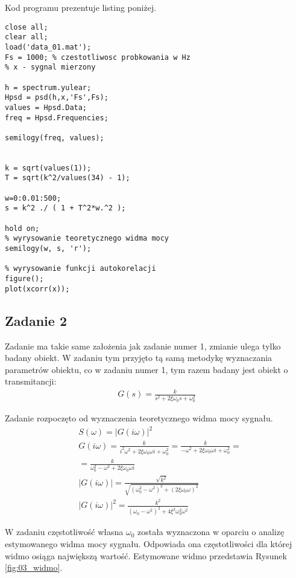 \documentclass[a4paper,15pt]{article}
\begin{document}
Kod programu prezentuje listing poniżej.
\begin{lstlisting}[caption=Zadanie 1, captionpos=b,label=lis1, firstnumber=1,frame=single]
close all;
clear all;
load('data_01.mat');
Fs = 1000; % czestotliwosc probkowania w Hz
% x - sygnal mierzony

h = spectrum.yulear;
Hpsd = psd(h,x,'Fs',Fs);
values = Hpsd.Data;
freq = Hpsd.Frequencies;

semilogy(freq, values);


k = sqrt(values(1));
T = sqrt(k^2/values(34) - 1);

w=0:0.01:500;
s = k^2 ./ ( 1 + T^2*w.^2 );

hold on;
% wyrysowanie teoretycznego widma mocy
semilogy(w, s, 'r');

% wyrysowanie funkcji autokorelacji
figure();
plot(xcorr(x));

\end{lstlisting}


\newpage
\subsection{Zadanie 2 }
Zadanie ma takie same założenia jak zadanie numer 1, zmianie ulega tylko badany obiekt. W zadaniu tym przyjęto tą samą metodykę wyznaczania parametrów obiektu, co w zadaniu numer 1, tym razem badany jest obiekt o transmitancji:
\begin{align*}
G(s) = \frac{k}{s^2+2\xi \omega _0 s + \omega _0 ^2}
\end{align*}

Zadanie rozpoczęto od wyznaczenia teoretycznego widma mocy sygnału. 
\begin{align*}
& S(\omega) = |G(i\omega)|^2 \\
& G(i\omega) = \frac{k}{i^2\omega ^2 + 2\xi \omega _0 \omega i + \omega _0^2} =
\frac{k}{-\omega ^2 + 2\xi\omega _0 \omega i + \omega _0^2} = \\
& = \frac{k}{\omega _0^2 - \omega^2 + 2\xi\omega _0 \omega i} \\
& |G(i\omega)| = \frac{\sqrt{k^2}}{\sqrt{(\omega _0 ^2 - \omega ^2) ^2 + (2\xi\omega _0 \omega)^2}} \\
& |G(i\omega)|^2 = \frac{k^2}{(\omega _0 - \omega ^2 ) ^2 + 4\xi ^2 \omega _0 ^2 \omega ^2}
\end{align*}

W zadaniu częstotliwość własna \( \omega _0 \) została wyznaczona w oparciu o analizę estymowanego widma mocy sygnału. Odpowiada ona częstotliwości dla której widmo osiąga największą wartość. Estymowane widmo przedstawia Rysunek \ref{fig:03_widmo}. 
\end{document}
